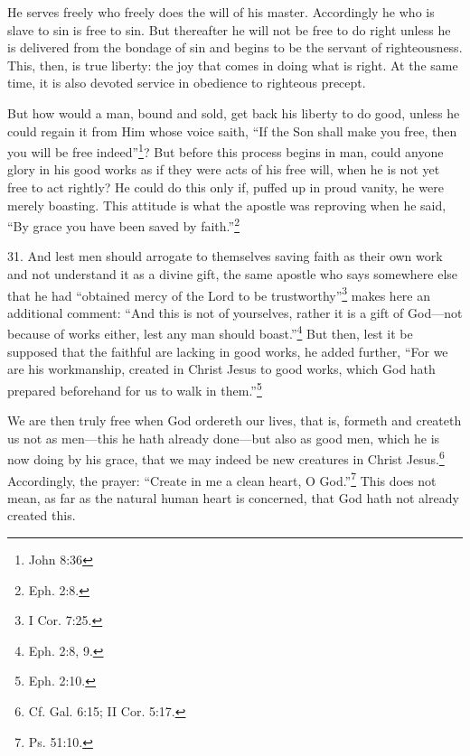 He serves freely who freely does the will of his master. Accordingly he who is slave to sin is free to sin. But thereafter he will not be free to do right unless he is delivered from the bondage of sin and begins to be the servant of righteousness. This, then, is true liberty: the joy that comes in doing what is right. At the same time, it is also devoted service in obedience to righteous precept.

But how would a man, bound and sold, get back his liberty to do good, unless he could regain it from Him whose voice saith, ``If the Son shall make you free, then you will be free indeed''\footnote{John 8:36}? But before this process begins in man, could anyone glory in his good works as if they were acts of his free will, when he is not yet free to act rightly? He could do this only if, puffed up in proud vanity, he were merely boasting. This attitude is what the apostle was reproving when he said, ``By grace you have been saved by faith.''\footnote{Eph. 2:8.}

31. And lest men should arrogate to themselves saving faith as their own work and not understand it as a divine gift, the same apostle who says somewhere else that he had ``obtained mercy of the Lord to be trustworthy''\footnote{I Cor. 7:25.} makes here an additional comment: ``And this is not of yourselves, rather it is a gift of God—not because of works either, lest any man should boast.''\footnote{Eph. 2:8, 9.} But then, lest it be supposed that the faithful are lacking in good works, he added further, ``For we are his workmanship, created in Christ Jesus to good works, which God hath prepared beforehand for us to walk in them.''\footnote{Eph. 2:10.}

We are then truly free when God ordereth our lives, that is, formeth and createth us not as men—this he hath already done—but also as good men, which he is now doing by his grace, that we may indeed be new creatures in Christ Jesus.\footnote{Cf. Gal. 6:15; II Cor. 5:17.} Accordingly, the prayer: ``Create in me a clean heart, O God.''\footnote{Ps. 51:10.} This does not mean, as far as the natural human heart is concerned, that God hath not already created this.

